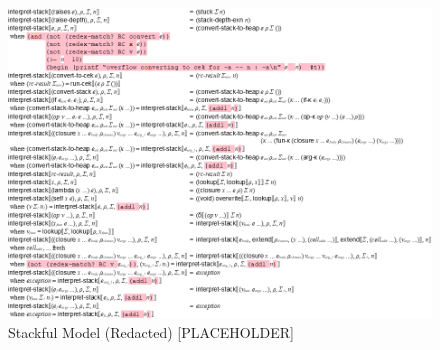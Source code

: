 \begin{appendices}

    \begin{figure}[!h]
        \centering
        \includegraphics[scale=0.4]{sections/figures/interpret-stack-redacted.png}
        \caption{Stackful Model (Redacted) [PLACEHOLDER]}
        \label{fig:interpret-stack-redacted}
    \end{figure}


\end{appendices}
